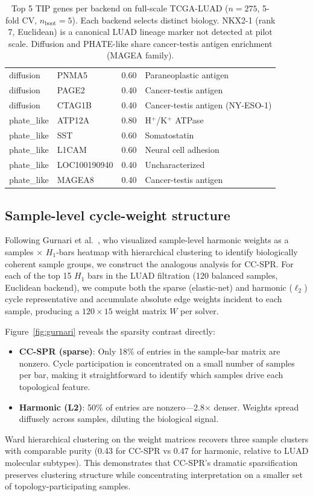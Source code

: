 \documentclass[11pt]{article}
\begin{document}
\begin{table}[h]
\begin{tabular}{llcl}
diffusion & PNMA5 & 0.60 & Paraneoplastic antigen \\
diffusion & PAGE2 & 0.40 & Cancer-testis antigen \\
diffusion & CTAG1B & 0.40 & Cancer-testis antigen (NY-ESO-1) \\
\midrule
phate\_like & ATP12A & 0.80 & H$^+$/K$^+$ ATPase \\
phate\_like & SST & 0.60 & Somatostatin \\
phate\_like & L1CAM & 0.60 & Neural cell adhesion \\
phate\_like & LOC100190940 & 0.40 & Uncharacterized \\
phate\_like & MAGEA8 & 0.40 & Cancer-testis antigen \\
\bottomrule
\end{tabular}
\caption{Top 5 TIP genes per backend on full-scale TCGA-LUAD ($n = 275$, 5-fold CV, $n_{\text{boot}} = 5$).
Each backend selects distinct biology.
NKX2-1 (rank 7, Euclidean) is a canonical LUAD lineage marker not detected at pilot scale.
Diffusion and PHATE-like share cancer-testis antigen enrichment (MAGEA family).}
\label{tab:fullscale_genes}
\end{table}

\subsection{Sample-level cycle-weight structure}
\label{sec:cycleweight}

Following Gurnari et al.\ \cite{harmonicPH}, who visualized sample-level harmonic weights as a samples $\times$ $H_1$-bars heatmap with hierarchical clustering to identify biologically coherent sample groups, we construct the analogous analysis for CC-SPR.
For each of the top 15 $H_1$ bars in the LUAD filtration (120 balanced samples, Euclidean backend), we compute both the sparse (elastic-net) and harmonic ($\ell_2$) cycle representative and accumulate absolute edge weights incident to each sample, producing a $120 \times 15$ weight matrix $W$ per solver.

Figure~\ref{fig:gurnari} reveals the sparsity contrast directly:
\begin{itemize}[leftmargin=1.5em]
\item \textbf{CC-SPR (sparse)}: Only 18\% of entries in the sample-bar matrix are nonzero. Cycle participation is concentrated on a small number of samples per bar, making it straightforward to identify which samples drive each topological feature.
\item \textbf{Harmonic (L2)}: 50\% of entries are nonzero---2.8$\times$ denser. Weights spread diffusely across samples, diluting the biological signal.
\end{itemize}
Ward hierarchical clustering on the weight matrices recovers three sample clusters with comparable purity (0.43 for CC-SPR vs 0.47 for harmonic, relative to LUAD molecular subtypes).
This demonstrates that CC-SPR's dramatic sparsification preserves clustering structure while concentrating interpretation on a smaller set of topology-participating samples.
\end{document}

